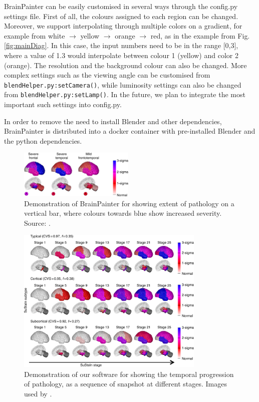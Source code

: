 \documentclass[final,times,twocolumn,authoryear]{elsarticle}
\begin{document}

BrainPainter can be easily customised in several ways through the config.py settings file. First of all, the colours assigned to each region can be changed. Moreover, we support interpolating through multiple colors on a gradient, for example from white $\rightarrow$ yellow $\rightarrow$ orange $\rightarrow$ red, as in the example from Fig. \ref{fig:mainDiag}. In this case, the input numbers need to be in the range [0,3], where a value of 1.3 would interpolate between colour 1 (yellow) and color 2 (orange). The resolution and the background colour can also be changed. More complex settings such as the viewing angle can be customised from \verb|blendHelper.py:setCamera()|, while luminosity settings can also be changed from \verb|blendHelper.py:setLamp()|. In the future, we plan to integrate the most important such settings into config.py. 

In order to remove the need to install Blender and other dependencies, BrainPainter is distributed into a docker container with pre-installed Blender and the python dependencies. 


\begin{figure}
 \includegraphics[width=0.49\textwidth]{images/young_3brains.png}
 \caption{Demonstration of BrainPainter for showing extent of pathology on a vertical bar, where colours towards blue show increased severity. Source: \cite{young2018uncovering}.}
 \label{fig:youngExtent}
\end{figure}

\begin{figure}[htp]
\centering
 \includegraphics[width=0.8\textwidth, trim=20 0 0 220, clip]{images/young_progression.png}
 \caption{Demonstration of our software for showing the temporal progression of pathology, as a sequence of snapshot at different stages. Images used by \cite{young2018uncovering}.}
  \label{fig:youngProg}
\end{figure}
\end{document}
